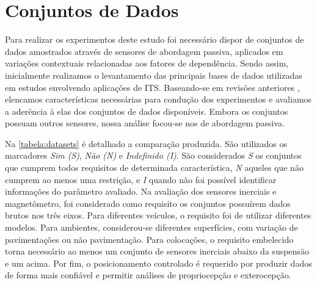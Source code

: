 \chapter{Conjuntos de Dados}
\label{cap:conjuntos_de_dados}

Para realizar os experimentos deste estudo foi necessário dispor de conjuntos de dados amostrados através de sensores de abordagem passiva, aplicados em variações contextuais relacionadas aos fatores de dependência. Sendo assim, inicialmente realizamos o levantamento das principais bases de dados utilizadas em estudos envolvendo aplicações de ITS. Baseando-se em revisões anteriores \cite{Geyer2020}, elencamos características necessárias para condução dos experimentos e avaliamos a aderência à elas dos conjuntos de dados disponíveis. Embora os conjuntos possuam outros sensores, nossa análise focou-se nos de abordagem passiva.

Na \autoref{tabela:datasets} é detalhado a comparação produzida. São utilizados os marcadores \emph{Sim (S)}, \emph{Não (N)} e \emph{Indefinido (I)}. São considerados \emph{S} os conjuntos que cumprem todos requisitos de determinada característica, \emph{N} aqueles que não cumprem ao menos uma restrição, e \emph{I} quando não foi possível identificar informações do parâmetro avaliado. Na avaliação dos sensores inerciais e magnetômetro, foi considerado como requisito os conjuntos possuírem dados brutos nos três eixos. Para diferentes veículos, o requisito foi de utilizar diferentes modelos. Para ambientes, considerou-se diferentes superfícies, com variação de pavimentações ou não pavimentação. Para colocações, o requisito embelecido torna necessário ao menos um conjunto de sensores inerciais abaixo da suspensão e um acima. Por fim, o posicionamento controlado é requerido por produzir dados de forma mais confiável e permitir análises de propriocepção e exterocepção.

